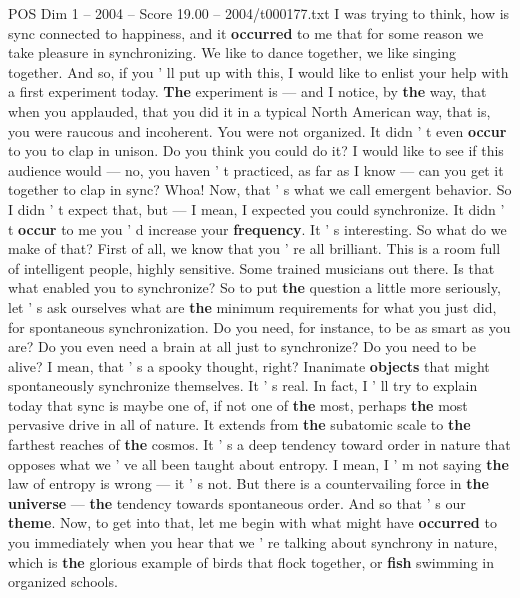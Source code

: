 \begin{textsample}{POS Dim 1 – 2004 – Score 19.00 – 2004/t000177.txt}  \label{ex:f1_pos_024}
I was trying to think, how is sync connected to happiness, and it \textbf{occurred} to me that for some reason we take pleasure in synchronizing.
We like to dance together, we like singing together.
And so, if you ' ll put up with this, I would like to enlist your help with a first experiment today. \textbf{The} experiment is — and I notice, by \textbf{the} way, that when you applauded, that you did it in a typical North American way, that is, you were raucous and incoherent.
You were not organized.
It didn ' t even \textbf{occur} to you to clap in unison.
Do you think you could do it?
I would like to see if this audience would — no, you haven ' t practiced, as far as I know — can you get it together to clap in sync?
Whoa!
Now, that ' s what we call emergent behavior.
So I didn ' t expect that, but — I mean, I expected you could synchronize.
It didn ' t \textbf{occur} to me you ' d increase your \textbf{frequency}.
It ' s interesting.
So what do we make of that?
First of all, we know that you ' re all brilliant.
This is a room full of intelligent people, highly sensitive.
Some trained musicians out there.
Is that what enabled you to synchronize?
So to put \textbf{the} question a little more seriously, let ' s ask ourselves what are \textbf{the} minimum requirements for what you just did, for spontaneous synchronization.
Do you need, for instance, to be as smart as you are?
Do you even need a brain at all just to synchronize?
Do you need to be alive?
I mean, that ' s a spooky thought, right?
Inanimate \textbf{objects} that might spontaneously synchronize themselves.
It ' s real.
In fact, I ' ll try to explain today that sync is maybe one of, if not one of \textbf{the} most, perhaps \textbf{the} most pervasive drive in all of nature.
It extends from \textbf{the} subatomic scale to \textbf{the} farthest reaches of \textbf{the} cosmos.
It ' s a deep tendency toward order in nature that opposes what we ' ve all been taught about entropy.
I mean, I ' m not saying \textbf{the} law of entropy is wrong — it ' s not.
But there is a countervailing force in \textbf{the} \textbf{universe} — \textbf{the} tendency towards spontaneous order.
And so that ' s our \textbf{theme}.
Now, to get into that, let me begin with what might have \textbf{occurred} to you immediately when you hear that we ' re talking about synchrony in nature, which is \textbf{the} glorious example of birds that flock together, or \textbf{fish} swimming in organized schools.

\end{textsample}
